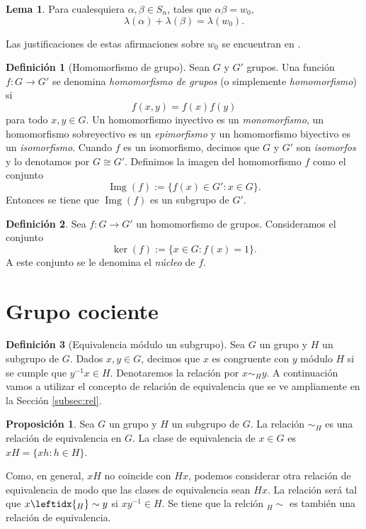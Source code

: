 \documentclass[12pt]{book}
\theoremstyle{definition}
\newtheorem{defi}{Definición}[section]
\newtheorem{prop}{Proposición}[section]
\newtheorem{lema}{Lema}[section]
\DeclareMathOperator{\img}{Img}
\begin{document}
\begin{lema}
Para cualesquiera $\alpha,\beta\in S_n$, tales que $\alpha\beta = w_0$,
$$\lambda(\alpha)+\lambda(\beta)=\lambda(w_0).$$
\label{lema:long_per}
\end{lema}
Las justificaciones de estas afirmaciones sobre $w_0$ se encuentran en \cite{br_gr}.


\begin{defi}[Homomorfismo de grupo]
Sean $G$ y $G'$ grupos. Una función $f:G\rightarrow G'$ se denomina \textit{homomorfismo de grupos} (o simplemente \textit{homomorfismo}) si
$$f(x,y)=f(x)f(y)$$
para todo $x,y\in G$. Un homomorfismo inyectivo es un \textit{monomorfismo}, un homomorfismo sobreyectivo es un \textit{epimorfismo} y un homomorfismo biyectivo es un \textit{isomorfismo}. Cuando $f$ es un isomorfismo, decimos que $G$ y $G'$ son \textit{isomorfos} y lo denotamos por $G\cong G'$. Definimos la imagen del homomorfismo $f$ como el conjunto
$$\img(f):= \{f(x)\in G':x\in G\}.$$
Entonces se tiene que $\img(f)$ es un subgrupo de $G'$.
\end{defi}

\begin{defi}
Sea $f:G\rightarrow G'$ un homomorfismo de grupos. Consideramos el conjunto
$$\ker(f):=\{x\in G : f(x)=1\}.$$
A este conjunto se le denomina el \textit{núcleo} de $f$.
\end{defi}

\section{Grupo cociente}

\begin{defi}[Equivalencia módulo un subgrupo]
Sea $G$ un grupo y $H$ un subgrupo de $G$. Dados $x,y\in G$, decimos que $x$ es congruente con $y$ módulo $H$ si se cumple que $y^{-1}x\in H$. Denotaremos la relación por $x\sim_H y$. A continuación vamos a utilizar el concepto de relación de equivalencia que se ve ampliamente en la Sección \ref{subsec:rel}.
\end{defi}



\begin{prop}
Sea $G$ un grupo y $H$ un subgrupo de $G$. La relación $\sim_H$ es una relación de equivalencia en $G$. La clase de equivalencia de $x\in G$ es $xH=\{xh:h\in H\}$.
\end{prop}

Como, en general, $xH$ no coincide con $Hx$, podemos considerar otra relación de equivalencia de modo que las clases de equivalencia sean $Hx$. La relación será tal que $x\leftidx{_H}\sim y$ si $xy^{-1}\in H$. Se tiene que la relción $_H\sim$ es también una relación de equivalencia.
\end{document}
